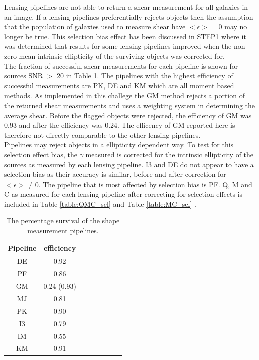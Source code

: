 Lensing pipelines are not able to return 
a shear measurement for all galaxies in an
image. If a lensing pipelines preferentially rejects 
objects then the assumption that the population of galaxies used to
measure shear have $< \epsilon > = 0 $ may no longer be true. 
This selection bias effect has been discussed in STEP1 
where it was determined that results for some lensing pipelines  
improved when the non-zero mean intrinsic ellipticity of the surviving 
objects was corrected for. \\
\indent The fraction of successful shear measurements
 for each pipeline is shown for sources SNR $>$ 20 in Table \ref{table:sur_sel}.
The pipelines with the highest efficiency of successful measurements
are PK, DE and KM which are all moment based methods. 
As implemented in this challege the GM method
rejects a portion of the returned shear measurements and 
uses a weighting system in determining the average shear. Before the
flagged objects were rejected, the efficiency of GM was 0.93 and after
the efficiency was 0.24. The efficency of GM reported here is
therefore not directly comparable to the other lensing pipelines. 
\\
\indent
Pipelines may reject objects in a ellipticity dependent way. To test
for this selection effect bias, the $\gamma$ measured is corrected for
the intrinsic ellipticity of the sources as measured by each lensing
pipeline. I3 and DE do not appear to have a selection bias as their
accuracy is similar, before and after correction for $< \epsilon > \neq 0 $. The
pipeline that is most affected by selection bias is PF. Q, M and C as measured for each
lensing pipeline after correcting for selection effects is included in
Table \ref{table:QMC_sel} and Table \ref{table:MC_sel} . 


\begin{table}
        \centering
        \begin{tabular}{|c|c|c|c|c|c|c|c|}  
          \hline
          Pipeline  &  efficiency \\
          \hline
          DE &  0.92 \\
          \hline
          PF & 0.86 \\
          \hline
          GM & 0.24 (0.93) \\
          \hline
          MJ & 0.81 \\
          \hline
          PK & 0.90 \\
          \hline
          I3 &  0.79 \\
          \hline
          IM &  0.55 \\
          \hline
          KM & 0.91 \\
          \hline
        \end{tabular}
        \caption{The percentage survival of the shape measurement pipelines.}
    \label{table:sur_sel}
\end{table}



